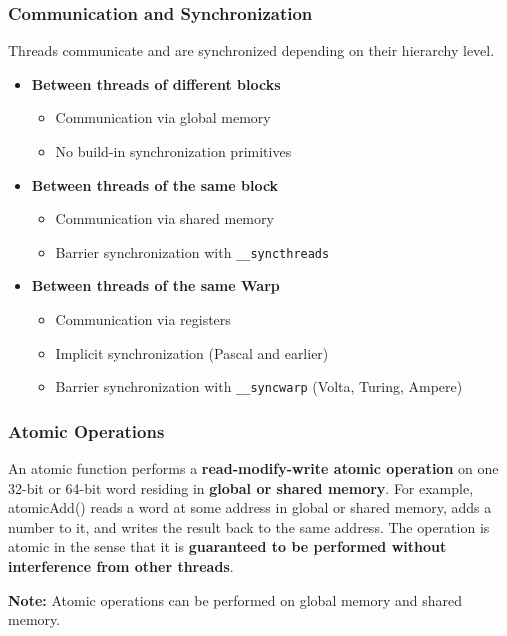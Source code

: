 \documentclass[aspectratio=169,handout]{beamer}
\begin{document}
\begin{frame}[fragile]
\frametitle{Communication and Synchronization}
Threads communicate and are synchronized depending on their hierarchy level.
\begin{itemize}
		\item<1->[] \textbf{Between threads of different blocks}
	\begin{itemize}
		\item<2-> Communication via global memory
		\item<2-> No build-in synchronization primitives
	\end{itemize}
	\item<3->[] \textbf{Between threads of the same block}
\begin{itemize}
	\item<4-> Communication via shared memory
	\item<4-> Barrier synchronization with \texttt{\_\_syncthreads}
\end{itemize}
	\item<5->[] \textbf{Between threads of the same Warp}
	\begin{itemize}
		\item<6-> Communication via registers 
		\item<6-> Implicit synchronization (Pascal and earlier)
		\item<6-> Barrier synchronization with \texttt{\_\_syncwarp} (Volta, Turing, Ampere)

	\end{itemize}
\end{itemize}
\end{frame}




\begin{frame}[fragile]
\frametitle{Atomic Operations}
\begin{mdframed}[frametitle={CUDA Programming Guide}]
An atomic function performs a \textbf{read-modify-write atomic operation} on one 32-bit or 64-bit word residing in \textbf{global or shared memory}. For example, atomicAdd() reads a word at some address in global or shared memory, adds a number to it, and writes the result back to the same address. The operation is atomic in the sense that it is \textbf{guaranteed to be performed without interference from other threads}.
\end{mdframed}

\vspace{1cm}
\textbf{Note:} Atomic operations can be performed on global memory and shared memory.

\end{frame}
\end{document}
